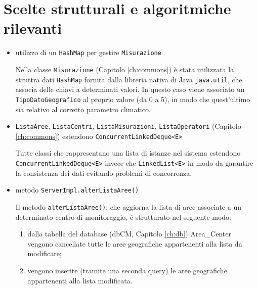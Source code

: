 \chapter{Scelte strutturali e algoritmiche rilevanti}
\begin{itemize}
	\item utilizzo di un \texttt{HashMap} per gestire \texttt{Misurazione}
	
	Nella classe \texttt{Misurazione} (Capitolo \ref{ch:commons}) è stata utilizzata la struttra dati \texttt{HashMap} fornita dalla libreria nativa di Java \texttt{java.util}, che associa delle chiavi a determinati valori. In questo caso viene associato un \texttt{TipoDatoGeografico} al proprio valore (da 0 a 5), in modo che quest'ultimo sia relativo al corretto parametro climatico.
	
	\item \texttt{ListaAree}, \texttt{ListaCentri}, \texttt{ListaMisurazioni}, \texttt{ListaOperatori} (Capitolo \ref{ch:commons}) estendono \texttt{ConcurrentLinkedDeque<E>}
	
	Tutte classi che rappresentano una lista di istanze nel sistema estendono \texttt{ConcurrentLinkedDeque<E>} invece che \texttt{LinkedList<E>} in modo da garantire la consistenza dei dati evitando problemi di concorrenza.
	
	\item metodo \texttt{ServerImpl.alterListaAree()}
	
	Il metodo \texttt{alterListaAree()}, che aggiorna la lista di aree associate a un determinato centro di monitoraggio, è strutturato nel seguente modo:
	\begin{enumerate}
		\item dalla tabella del database (dbCM, Capitolo \ref{ch:db}) Area\_Center vengono cancellate tutte le aree geografiche appartenenti alla lista da modificare;
		\item vengono inserite (tramite una seconda query) le aree geografiche appartenenti alla lista modificata.
	\end{enumerate}
	

\end{itemize}
